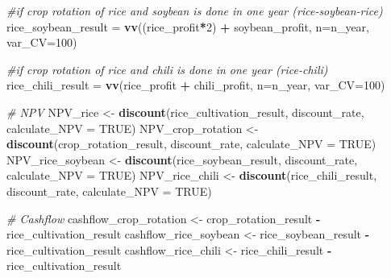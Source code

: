 \documentclass[
]{article}
\newenvironment{Shaded}{\begin{snugshade}}{\end{snugshade}}
\newcommand{\AttributeTok}[1]{\textcolor[rgb]{0.13,0.29,0.53}{#1}}
\newcommand{\CommentTok}[1]{\textcolor[rgb]{0.56,0.35,0.01}{\textit{#1}}}
\newcommand{\ConstantTok}[1]{\textcolor[rgb]{0.56,0.35,0.01}{#1}}
\newcommand{\DecValTok}[1]{\textcolor[rgb]{0.00,0.00,0.81}{#1}}
\newcommand{\FunctionTok}[1]{\textcolor[rgb]{0.13,0.29,0.53}{\textbf{#1}}}
\newcommand{\NormalTok}[1]{#1}
\newcommand{\OtherTok}[1]{\textcolor[rgb]{0.56,0.35,0.01}{#1}}
\newcommand{\SpecialCharTok}[1]{\textcolor[rgb]{0.81,0.36,0.00}{\textbf{#1}}}
\begin{document}
\begin{Shaded}
\begin{Highlighting}[]
  \CommentTok{\#if crop rotation of rice and soybean is done in one year (rice{-}soybean{-}rice)}
\NormalTok{  rice\_soybean\_result }\OtherTok{=} \FunctionTok{vv}\NormalTok{((rice\_profit}\SpecialCharTok{*}\DecValTok{2}\NormalTok{) }\SpecialCharTok{+}\NormalTok{ soybean\_profit, }\AttributeTok{n=}\NormalTok{n\_year, }\AttributeTok{var\_CV=}\DecValTok{100}\NormalTok{)}
  
  \CommentTok{\#if crop rotation of rice and chili is done in one year (rice{-}chili)}
\NormalTok{  rice\_chili\_result }\OtherTok{=} \FunctionTok{vv}\NormalTok{(rice\_profit }\SpecialCharTok{+}\NormalTok{ chili\_profit, }\AttributeTok{n=}\NormalTok{n\_year, }\AttributeTok{var\_CV=}\DecValTok{100}\NormalTok{)}
  
  
  \CommentTok{\# NPV}
\NormalTok{  NPV\_rice }\OtherTok{\textless{}{-}} \FunctionTok{discount}\NormalTok{(rice\_cultivation\_result, discount\_rate, }\AttributeTok{calculate\_NPV =} \ConstantTok{TRUE}\NormalTok{)}
\NormalTok{  NPV\_crop\_rotation }\OtherTok{\textless{}{-}} \FunctionTok{discount}\NormalTok{(crop\_rotation\_result, discount\_rate, }\AttributeTok{calculate\_NPV =} \ConstantTok{TRUE}\NormalTok{)}
\NormalTok{  NPV\_rice\_soybean }\OtherTok{\textless{}{-}} \FunctionTok{discount}\NormalTok{(rice\_soybean\_result, discount\_rate, }\AttributeTok{calculate\_NPV =} \ConstantTok{TRUE}\NormalTok{)}
\NormalTok{  NPV\_rice\_chili }\OtherTok{\textless{}{-}} \FunctionTok{discount}\NormalTok{(rice\_chili\_result, discount\_rate, }\AttributeTok{calculate\_NPV =} \ConstantTok{TRUE}\NormalTok{)}
  
  
  \CommentTok{\# Cashflow}
\NormalTok{  cashflow\_crop\_rotation }\OtherTok{\textless{}{-}}\NormalTok{ crop\_rotation\_result }\SpecialCharTok{{-}}\NormalTok{ rice\_cultivation\_result}
\NormalTok{  cashflow\_rice\_soybean }\OtherTok{\textless{}{-}}\NormalTok{ rice\_soybean\_result }\SpecialCharTok{{-}}\NormalTok{ rice\_cultivation\_result}
\NormalTok{  cashflow\_rice\_chili }\OtherTok{\textless{}{-}}\NormalTok{ rice\_chili\_result }\SpecialCharTok{{-}}\NormalTok{ rice\_cultivation\_result}
  

\end{Highlighting}
\end{Shaded}
\end{document}
